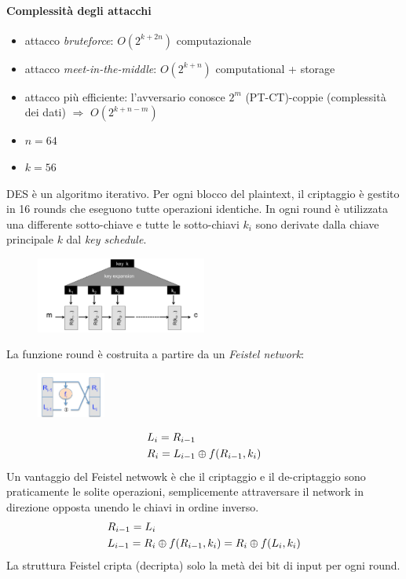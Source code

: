 \documentclass[a4paper,12pt]{article}
\begin{document}
\paragraph{Complessità degli attacchi}
\begin{itemize}
	\item attacco \textit{bruteforce}: $O(2^{k+2n})$ computazionale
	\item attacco \textit{meet-in-the-middle}: $O(2^{k+n})$ computational + storage
	\item attacco più efficiente: l'avversario conosce $2^m$ (PT-CT)-coppie (complessità dei dati) $\Rightarrow$ $O(2^{k+n-m})$
\end{itemize}
\begin{itemize}
	\item $n = 64$
	\item $k = 56$
\end{itemize}
DES è un algoritmo iterativo. Per ogni blocco del plaintext, il criptaggio è gestito in 16 rounds che eseguono tutte operazioni identiche. 
In ogni round è utilizzata una differente sotto-chiave e tutte le sotto-chiavi $k_i$ sono derivate dalla chiave principale $k$ dal \textit{key schedule}.
\begin{figure}[H]
  \centering
  \includegraphics[width=0.5\textwidth]{img/key-schedule}
\end{figure}
La funzione round è costruita a partire da un \textit{Feistel network}:
\begin{figure}[H]
  \centering
  \includegraphics[width=0.2\textwidth]{img/feistel}
\end{figure}
\begin{align}
&L_i = R_{i-1} \notag\\
&R_i = L_{i-1} \oplus f(R_{i-1}, k_i) \notag
\end{align}
Un vantaggio del Feistel netwowk è che il criptaggio e il de-criptaggio sono praticamente le solite operazioni, semplicemente attraversare il network in direzione opposta unendo le chiavi in ordine inverso.
\begin{align}
&R_{i-1} = L_i \notag\\
&L_{i-1} = R_i \oplus f(R_{i-1}, k_i) = R_i \oplus f(L_i, k_i) \notag
\end{align}
La struttura Feistel cripta (decripta) solo la metà dei bit di input per ogni round.
\end{document}

